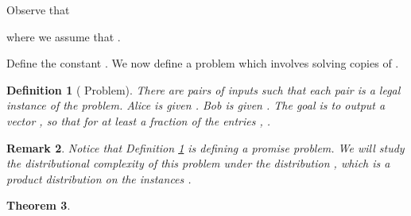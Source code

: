 \documentclass[twoside,leqno,twocolumn]{article}
\newtheorem{definition}{Definition}[section]
\newtheorem{remark}{Remark}[section]
\newtheorem{theorem}{Theorem}[section]
\newtheorem{definition}[theorem]{Definition}
\newtheorem{remark}[theorem]{Remark}
\begin{document}
Observe that

where we assume that . 
\iffalse Next, we look at -way protocols . In this case , where  is Alice's single message to Bob, and  is
Bob's output bit. By the chain rule,

since  is just a single bit. Again, by the chain rule,

since  since the
protocol is -way. It follows by (\ref{eqn:mutInf}) that assuming
,

\fi
Define the constant . 
We now define a problem which involves solving  copies of . 
\begin{definition}[ Problem]\label{def:multi} There are  pairs of
  inputs  such that each pair
   is a legal instance of the  problem. Alice
  is given .  Bob is given .
  The goal is to output a vector , so that for at
  least a  fraction of the entries , 
  .
\end{definition}
\begin{remark}
Notice that Definition \ref{def:multi} is defining a promise problem. We will 
study the distributional complexity of this problem under the distribution
, which is a product distribution on 
the  instances . 
\end{remark}
\begin{theorem}\label{thm:theMain}

\end{theorem}
\end{document}

